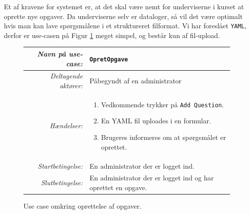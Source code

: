 \documentclass[12pt]{article}
\begin{document}
Et af kravene for systemet er, at det skal være nemt for underviserne i kurset at oprette nye opgaver. Da underviserne selv er dataloger, så vil det være optimalt hvis man kan lave spørgsmålene i et struktureret filformat. Vi har foreslået \verb!YAML!, derfor er use-casen på Figur \ref{fig:use_case3} meget simpel, og består kun af fil-upload.
\begin{figure}[htpb]
    \centering
    \begin{tabular}{r p{10cm}}
        \toprule
        \textit{Navn på use-case:} & \verb!OpretOpgave! \\
        \hline
        \textit{Deltagende aktører:} & Påbegyndt af en administrator \\
        \hline
        \textit{Hændelser:} & \begin{enumerate}[nolistsep]
            \item Vedkommende trykker på \verb!Add Question!.
            \item En YAML fil uploades i en formular.
            \item Brugeres informeres om at spørgsmålet er oprettet.
        \end{enumerate}  \\
        \hline
        \textit{Startbetingelse:} & En administrator der er logget ind. \\
        \hline
        \textit{Slutbetingelse:} & En administrator der er logget ind og har oprettet en opgave. \\
        \bottomrule
    \end{tabular}
    \caption{Use case omkring oprettelse af opgaver.}
    \label{fig:use_case3}
\end{figure}
\end{document}

